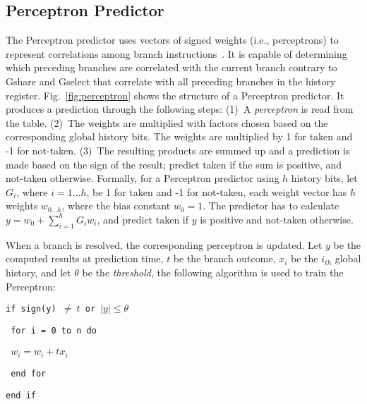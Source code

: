 \subsection{Perceptron Predictor}
\label{sec:background:dirpred:perceptron}
The Perceptron predictor uses vectors of signed weights (i.e., perceptrons) to represent correlations among branch instructions~\cite{perceptron}. It is capable of determining which preceding branches are correlated with the current branch contrary to Gshare and Gselect that correlate with all preceding branches in the history register. Fig.~\ref{fig:perceptron} shows the structure of a Perceptron predictor. It produces a prediction through the following steps: (1)~A \textit{perceptron} is read from the table. (2)~The weights are multiplied with factors chosen based on the  corresponding global history bits. The weights are multiplied by 1 for taken and -1 for not-taken. (3)~The resulting products are summed up and a prediction is made based on the sign of the result; predict taken if the sum is positive, and not-taken otherwise. Formally, for a Perceptron predictor using $h$ history bits, let $G_i$, where $i = 1...h$, be 1 for taken and -1 for not-taken, each weight vector has $h$ weights $w_{0...h}$, where the bias constant $w_0 = 1$. The predictor has to calculate $y = w_0 + \sum_{i=1}^{h} G_iw_i$, and predict taken if $y$ is positive and not-taken otherwise.

When a branch is resolved, the corresponding perceptron is updated. Let $y$ be the computed results at prediction time, $t$ be the branch outcome, $x_i$ be the $i_{th}$ global history, and let $\theta$ be the \textit{threshold}, the following algorithm is used to train the Perceptron:\vspace{8 mm}

\begin{spacing}{1} 
\texttt{if sign(y) $\neq\ t$ or $\left| y \right| \leq \theta$}

\texttt{\hspace{8mm} for i = 0 to n do}

\texttt{\hspace{16mm} $w_i = w_i + tx_i$}

\texttt{\hspace{8mm} end for}

\texttt{end if}
\end{spacing}
\vspace{8 mm}

